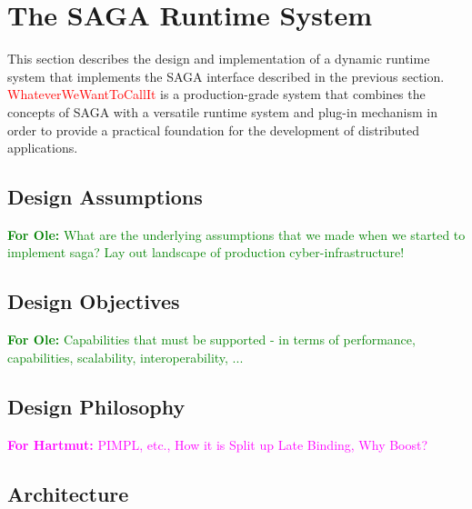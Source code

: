 \section{The SAGA Runtime System}

\newcommand{\thesagaimpl}{\textcolor{red}{WhateverWeWantToCallIt} }

\newcommand{\forhartmut}[1]{{\textcolor{magenta}{\textbf{For Hartmut:} #1 }}}
\newcommand{\forole}[1]{{\textcolor{green}{\textbf{For Ole:} #1 }}}
\newcommand{\foroleandhartmut}[1]{{\textcolor{blue}{\textbf{For Ole \& Hartmut:} #1 }}}

  This section describes the design and implementation of a dynamic runtime
  system that implements the SAGA interface described in the previous section.
  \thesagaimpl is a production-grade system that combines the concepts of SAGA
  with a versatile runtime system and plug-in mechanism in order to provide a
  practical foundation for the development of distributed applications.

  \subsection{Design Assumptions} 
  \forole{What are the underlying assumptions that we made when we started to
  implement saga? Lay out landscape of production cyber-infrastructure! }


  \subsection{Design Objectives}
  \forole{ Capabilities that must be supported - in terms of performance,
  capabilities, scalability, interoperability, ...}

  \subsection{Design Philosophy}
  \forhartmut{ PIMPL, etc., How it is Split up Late Binding, Why Boost?}

  \subsection{Architecture}
  
